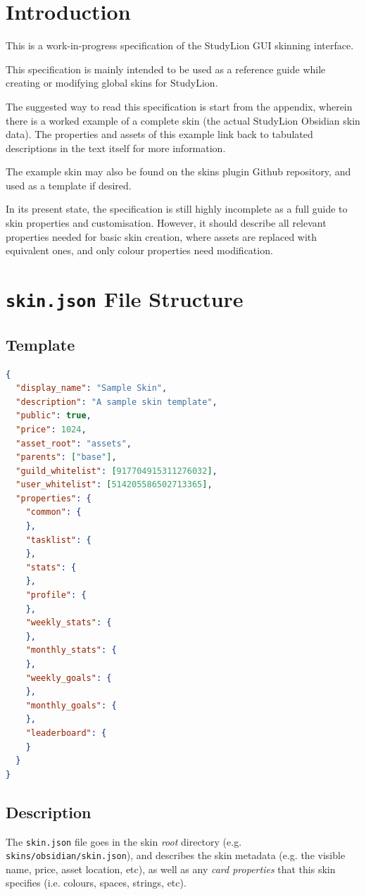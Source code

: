 \documentclass[a4paper, 10pt]{report}
\begin{document}
\tableofcontents
\setcounter{chapter}{-1}
\chapter{Introduction}
This is a work-in-progress specification of the StudyLion GUI skinning interface.

This specification is mainly intended to be used as a reference guide while creating or modifying
global skins for StudyLion.

The suggested way to read this specification is start from the appendix, wherein there is a worked example
of a complete skin (the actual StudyLion Obsidian skin data).
The properties and assets of this example link back to tabulated descriptions in the text itself for more information.

The example skin may also be found on the skins plugin Github repository, and used as a template if desired.

In its present state, the specification is still highly incomplete as a full guide to skin properties and customisation.
However, it should describe all relevant properties needed for basic skin creation,
where assets are replaced with equivalent ones, and only colour properties need modification.
\chapter{\texttt{skin.json} File Structure}
\section{Template}
\begin{lstlisting}[language=json,firstnumber=1]
{
  "display_name": "Sample Skin",
  "description": "A sample skin template",
  "public": true,
  "price": 1024,
  "asset_root": "assets",
  "parents": ["base"],
  "guild_whitelist": [917704915311276032],
  "user_whitelist": [514205586502713365],
  "properties": {
    "common": {
    },
    "tasklist": {
    },
    "stats": {
    },
    "profile": {
    },
    "weekly_stats": {
    },
    "monthly_stats": {
    },
    "weekly_goals": {
    },
    "monthly_goals": {
    },
    "leaderboard": {
    }
  }
}
\end{lstlisting}
\section{Description}
The \texttt{skin.json} file goes in the skin \emph{root} directory (e.g. \texttt{skins/obsidian/skin.json}),
and describes the skin metadata (e.g. the visible name, price, asset location, etc),
as well as any \emph{card properties} that this skin specifies (i.e. colours, spaces, strings, etc).
\end{document}
